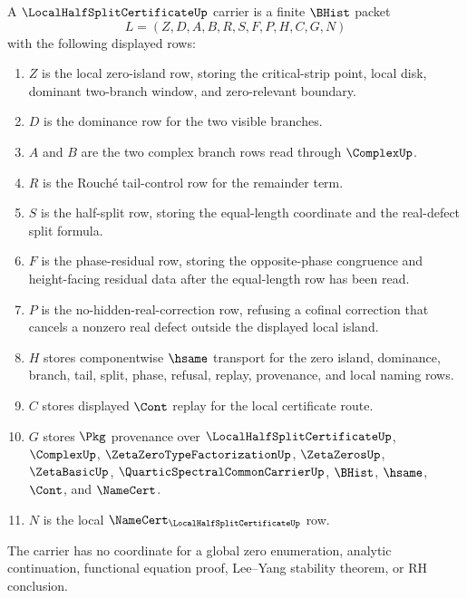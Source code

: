 \begin{definition}
\label{def:local-half-split-certificate-carrier}
A $\LocalHalfSplitCertificateUp$ carrier is a finite $\BHist$ packet
$$
L=(Z,D,A,B,R,S,F,P,H,C,G,N)
$$
with the following displayed rows:
\begin{enumerate}
\item $Z$ is the local zero-island row, storing the critical-strip point, local disk, dominant two-branch window, and zero-relevant boundary.
\item $D$ is the dominance row for the two visible branches.
\item $A$ and $B$ are the two complex branch rows read through $\ComplexUp$.
\item $R$ is the Rouch\'e tail-control row for the remainder term.
\item $S$ is the half-split row, storing the equal-length coordinate and the real-defect split formula.
\item $F$ is the phase-residual row, storing the opposite-phase congruence and height-facing residual data after the equal-length row has been read.
\item $P$ is the no-hidden-real-correction row, refusing a cofinal correction that cancels a nonzero real defect outside the displayed local island.
\item $H$ stores componentwise $\hsame$ transport for the zero island, dominance, branch, tail, split, phase, refusal, replay, provenance, and local naming rows.
\item $C$ stores displayed $\Cont$ replay for the local certificate route.
\item $G$ stores $\Pkg$ provenance over $\LocalHalfSplitCertificateUp$, $\ComplexUp$, $\ZetaZeroTypeFactorizationUp$, $\ZetaZerosUp$, $\ZetaBasicUp$, $\QuarticSpectralCommonCarrierUp$, $\BHist$, $\hsame$, $\Cont$, and $\NameCert$.
\item $N$ is the local $\NameCert_{\LocalHalfSplitCertificateUp}$ row.
\end{enumerate}
The carrier has no coordinate for a global zero enumeration, analytic continuation, functional equation proof, Lee--Yang stability theorem, or RH conclusion.
\end{definition}

